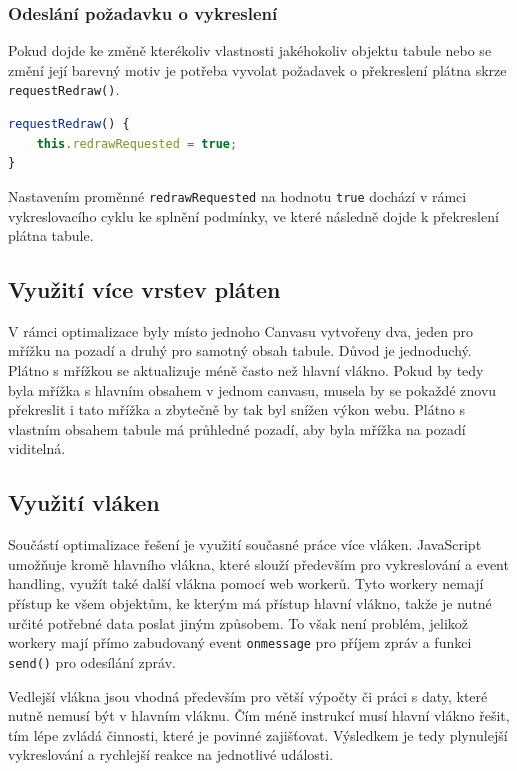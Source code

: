 \subsubsection{Odeslání požadavku o vykreslení}
\begin{sloppypar*}
Pokud dojde ke změně kterékoliv vlastnosti jakéhokoliv objektu tabule nebo se změní její barevný motiv je potřeba vyvolat požadavek o překreslení plátna skrze \texttt{requestRedraw()}.
\end{sloppypar*}
\begin{lstlisting}[language=JavaScript,label=src:JavaScript/WhiteboardCanvas.requestRedraw(),caption={Metoda requestRedraw() třídy WhiteboardCanvas}]
requestRedraw() {
	this.redrawRequested = true;
}
\end{lstlisting}
\begin{sloppypar*}
Nastavením proměnné \texttt{redrawRequested} na hodnotu \texttt{true} dochází v rámci vykreslovacího cyklu ke splnění podmínky, ve které následně dojde k překreslení plátna tabule.
\end{sloppypar*}



\subsection{Využití více vrstev pláten}
V rámci optimalizace byly místo jednoho Canvasu vytvořeny dva, jeden pro mřížku na pozadí a druhý pro samotný obsah tabule.
Důvod je jednoduchý. Plátno s mřížkou se aktualizuje méně často než hlavní vlákno.
Pokud by tedy byla mřížka s hlavním obsahem v jednom canvasu, musela by se pokaždé znovu překreslit i tato mřížka a zbytečně by tak byl snížen výkon webu.
Plátno s vlastním obsahem tabule má průhledné pozadí, aby byla mřížka na pozadí viditelná.



\subsection{Využití vláken}
\begin{sloppypar*}
Součástí optimalizace řešení je využití současné práce více vláken.
JavaScript umožňuje kromě hlavního vlákna, které slouží především pro vykreslování a event handling, využít také další vlákna pomocí web workerů.
Tyto workery nemají přístup ke všem objektům, ke kterým má přístup hlavní vlákno, takže je nutné určité potřebné data poslat jiným způsobem.
To však není problém, jelikož workery mají přímo zabudovaný event \texttt{onmessage} pro příjem zpráv a funkci \texttt{send()} pro odesílání zpráv.
\end{sloppypar*}
Vedlejší vlákna jsou vhodná především pro větší výpočty či práci s daty, které nutně nemusí být v hlavním vláknu.
Čím méně instrukcí musí hlavní vlákno řešit, tím lépe zvládá činnosti, které je povinné zajišťovat.
Výsledkem je tedy plynulejší vykreslování a rychlejší reakce na jednotlivé události.

